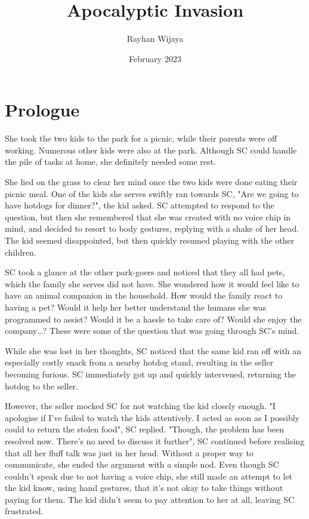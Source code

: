 \documentclass[12pt]{book}
\title{Apocalyptic Invasion}
\author{Rayhan Wijaya}
\date{February 2023}
\begin{document}
\maketitle

\section*{Prologue}

She took the two kids to the park for a picnic, while
their parents were off working. Numerous other kids were
also at the park. Although SC could handle the pile of
tasks at home, she definitely needed some rest.

She lied on the grass to clear her mind once the two kids
were done eating their picnic meal. One of the kids she
serves swiftly ran towards SC, "Are we going to have
hotdogs for dinner?", the kid asked. SC attempted to
respond to the question, but then she remembered that she
was created with no voice chip in mind, and decided to
resort to body gestures, replying with a shake of her
head. The kid seemed disappointed, but then quickly
resumed playing with the other children.

SC took a glance at the other park-goers and noticed that
they all had pets, which the family she serves did not
have. She wondered how it would feel like to have an
animal companion in the household. How would the family
react to having a pet? Would it help her better
understand the humans she was programmed to assist? Would
it be a hassle to take care of? Would she enjoy the
company…? These were some of the question that was going
through SC’s mind.

While she was lost in her thoughts, SC noticed that the
same kid ran off with an especially costly snack from a
nearby hotdog stand, resulting in the seller becoming
furious. SC immediately got up and quickly intervened,
returning the hotdog to the seller.

However, the seller mocked SC for not watching the kid
closely enough. "I apologise if I’ve failed to watch the
kids attentively. I acted as soon as I possibly could to
return the stolen food", SC replied. "Though, the problem
has been resolved now. There’s no need to discuss it
further", SC continued before realising that all her
fluff talk was just in her head. Without a proper way to
communicate, she ended the argument with a simple nod.
Even though SC couldn’t speak due to not having a voice
chip, she still made an attempt to let the kid know,
using hand gestures, that it’s not okay to take things
without paying for them. The kid didn’t seem to pay
attention to her at all, leaving SC frustrated.
\end{document}
